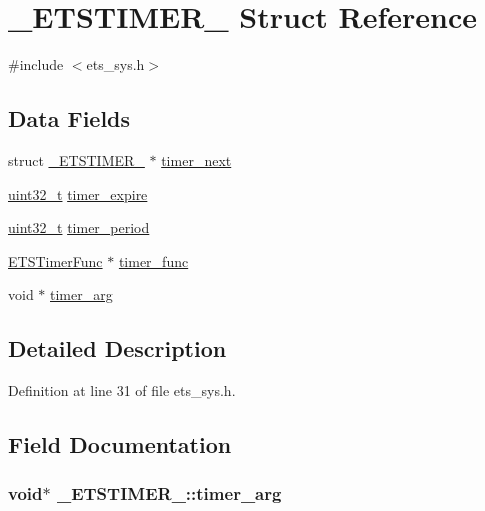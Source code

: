 \hypertarget{struct__ETSTIMER__}{\section{\-\_\-\-E\-T\-S\-T\-I\-M\-E\-R\-\_\- Struct Reference}
\label{struct__ETSTIMER__}
}


{\ttfamily \#include $<$ets\-\_\-sys.\-h$>$}

\subsection*{Data Fields}
\begin{DoxyCompactItemize}
\item 
struct \hyperlink{struct__ETSTIMER__}{\-\_\-\-E\-T\-S\-T\-I\-M\-E\-R\-\_\-} $\ast$ \hyperlink{struct__ETSTIMER___a6835174d54718f900f1dd6fdd5194419}{timer\-\_\-next}
\item 
\hyperlink{send_8c_a435d1572bf3f880d55459d9805097f62}{uint32\-\_\-t} \hyperlink{struct__ETSTIMER___a34542a46b29211ca7f72e4d0bb2dfd60}{timer\-\_\-expire}
\item 
\hyperlink{send_8c_a435d1572bf3f880d55459d9805097f62}{uint32\-\_\-t} \hyperlink{struct__ETSTIMER___ad6bdd67bbd00c9d2a30052e82aac2c9a}{timer\-\_\-period}
\item 
\hyperlink{ets__sys_8h_a9b98fc011315c1e79ebaf55e92265afa}{E\-T\-S\-Timer\-Func} $\ast$ \hyperlink{struct__ETSTIMER___afaaff07c40e4f2b2c4de07d60981c910}{timer\-\_\-func}
\item 
void $\ast$ \hyperlink{struct__ETSTIMER___ac088ddf257850948040acf7399c9715a}{timer\-\_\-arg}
\end{DoxyCompactItemize}


\subsection{Detailed Description}


Definition at line 31 of file ets\-\_\-sys.\-h.



\subsection{Field Documentation}
\hypertarget{struct__ETSTIMER___ac088ddf257850948040acf7399c9715a}{
\subsubsection[{timer\-\_\-arg}]{\setlength{\rightskip}{0pt plus 5cm}void$\ast$ \-\_\-\-E\-T\-S\-T\-I\-M\-E\-R\-\_\-\-::timer\-\_\-arg}}\label{struct__ETSTIMER___ac088ddf257850948040acf7399c9715a}


